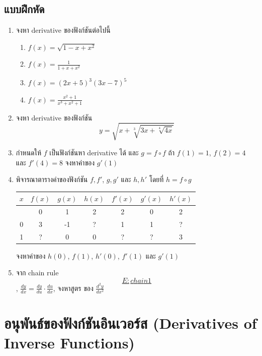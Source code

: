 \documentclass[
]{book}
\begin{document}
\subsection{แบบฝึกหัด}\label{uxe41uxe1auxe1auxe1duxe01uxe2buxe14}

\begin{enumerate}
\def\labelenumi{\arabic{enumi}.}
\item
  จงหา derivative ของฟังก์ชันต่อไปนี้

  \begin{enumerate}
  \def\labelenumii{\arabic{enumii}.}
  \item
    \(\displaystyle f(x) = \sqrt{1-x+x^2}\)
  \item
    \(\displaystyle f(x) = \frac{1}{1+x+x^2}\)
  \item
    \(\displaystyle f(x) = (2x+5)^3(3x-7)^5\)
  \item
    \(\displaystyle f(x) = \frac{x^2+1}{x^3+x^2+1}\)
  \end{enumerate}
\item
  จงหา derivative ของฟังก์ชัน
  \[y = \sqrt{x + \sqrt[3]{3x + \sqrt[4]{4x}}}\]
\item
  กำหนดให้ \(f\) เป็นฟังก์ชันหา derivative ได้ และ \(g = f \circ f\) ถ้า
  \(f(1) = 1\), \(f(2) = 4\) และ \(f'(4) = 8\) จงหาค่าของ \(g'(1)\)
\item
  พิจารณาตารางค่าของฟังก์ชัน \(f, f'\), \(g, g'\) และ \(h, h'\) โดยที่
  \(h=f\circ g\)

  \begin{longtable}[]{@{}ccccccc@{}}
  \toprule\noalign{}
  \(x\) & \(f(x)\) & \(g(x)\) & \(h(x)\) & \(f'(x)\) & \(g'(x)\) &
  \(h'(x)\) \\
  \midrule\noalign{}
  \endhead
  \bottomrule\noalign{}
  \endlastfoot
  -1 & 0 & 1 & 2 & 2 & 0 & 2 \\
  0 & 3 & -1 & ? & 1 & 1 & ? \\
  1 & ? & 0 & 0 & ? & ? & 3 \\
  \end{longtable}

  จงหาค่าของ \(h(0)\), \(f(1)\), \(h'(0)\), \(f'(1)\) และ \(g'(1)\)
\item
  จาก chain rule~\hyperref[E:chain1]{\[E:chain1\]},
  \(\frac{dy}{dx} = \frac{dy}{du} \cdot \frac{du}{dx}\), จงหาสูตร ของ
  \(\displaystyle \frac{d^2y}{dx^2}\)
\end{enumerate}

\section{อนุพันธ์ของฟังก์ชันอินเวอร์ส (Derivatives of Inverse
Functions)}\label{uxe2duxe19uxe1euxe19uxe18uxe02uxe2duxe07uxe1fuxe07uxe01uxe0auxe19uxe2duxe19uxe40uxe27uxe2duxe23uxe2a-derivatives-of-inverse-functions}
\end{document}
